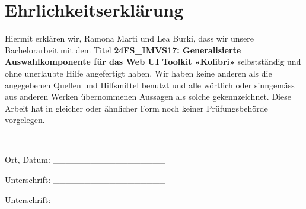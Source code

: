 \chapter*{Ehrlichkeitserklärung}

Hiermit erklären wir, Ramona Marti und Lea Burki, dass wir unsere Bachelorarbeit mit dem Titel 
\textbf{24FS\_IMVS17: Generalisierte Auswahlkomponente für das Web UI Toolkit «Kolibri»} 
selbstständig und ohne unerlaubte Hilfe angefertigt haben. 
Wir haben keine anderen als die angegebenen Quellen und Hilfsmittel benutzt und alle wörtlich 
oder sinngemäss aus anderen Werken übernommenen Aussagen als solche gekennzeichnet. 
Diese Arbeit hat in gleicher oder ähnlicher Form noch keiner Prüfungsbehörde vorgelegen. 

\begin{center} 
    \newline \newline \newline \newline

    Ort, Datum: \_\_\_\_\_\_\_\_\_\_\_\_\_\_\_\_\_\_
    \newline \newline \newline \newline 
    
    Unterschrift: \_\_\_\_\_\_\_\_\_\_\_\_\_\_\_\_\_\_
    \newline \newline \newline \newline 

    Unterschrift: \_\_\_\_\_\_\_\_\_\_\_\_\_\_\_\_\_\_
    \newline
\end{center}
